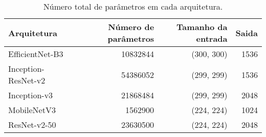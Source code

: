 \begin{table}
\caption{Número total de parâmetros em cada arquitetura.}
\label{tab:model_params}
\begin{tabular}{l|r|r|r}
\toprule
Arquitetura & Número de parâmetros & Tamanho da entrada & Saida \\
\midrule
EfficientNet-B3 & 10832844 & (300, 300) & 1536 \\
Inception-ResNet-v2 & 54386052 & (299, 299) & 1536 \\
Inception-v3 & 21868484 & (299, 299) & 2048 \\
MobileNetV3 & 1562900 & (224, 224) & 1024 \\
ResNet-v2-50 & 23630500 & (224, 224) & 2048 \\
\bottomrule
\end{tabular}
\end{table}
